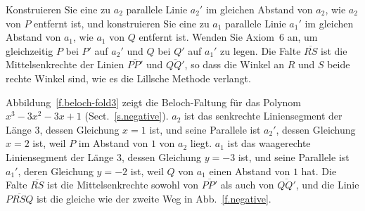 Konstruieren Sie eine zu $a_2$ parallele Linie $a_2'$ im gleichen Abstand von $a_2$, wie $a_2$ von $P$ entfernt ist, und konstruieren Sie eine zu $a_1$ parallele Linie $a_1'$ im gleichen Abstand von $a_1$, wie $a_1$ von $Q$ entfernt ist. Wenden Sie Axiom~6 an, um gleichzeitig $P$ bei $P'$ auf $a_2'$ und $Q$ bei $Q'$ auf $a_1'$ zu legen. Die Falte $\overline{RS}$ ist die Mittelsenkrechte der Linien $\overline{PP'}$ und $\overline{QQ'}$, so dass die Winkel an $R$ und $S$ beide rechte Winkel sind, wie es die Lillsche Methode verlangt.

Abbildung~\ref{f.beloch-fold3} zeigt die Beloch-Faltung für das Polynom $x^3-3x^2-3x+1$ (Sect.~\ref{s.negative}). $a_2$ ist das senkrechte Liniensegment der Länge $3$, dessen Gleichung $x=1$ ist, und seine Parallele ist $a_2'$, dessen Gleichung $x=2$ ist, weil $P$ im Abstand von $1$ von $a_2$ liegt. $a_1$ ist das waagerechte Liniensegment der Länge $3$, dessen Gleichung $y=-3$ ist, und seine Parallele ist $a_1'$, deren Gleichung $y=-2$ ist, weil $Q$ von $a_1$ einen Abstand von $1$ hat. Die Falte $\overline{RS}$ ist die Mittelsenkrechte sowohl von $\overline{PP'}$ als auch von $\overline{QQ'}$, und die Linie $\overline{PRSQ}$ ist die gleiche wie der zweite Weg in Abb.~\ref{f.negative}.

